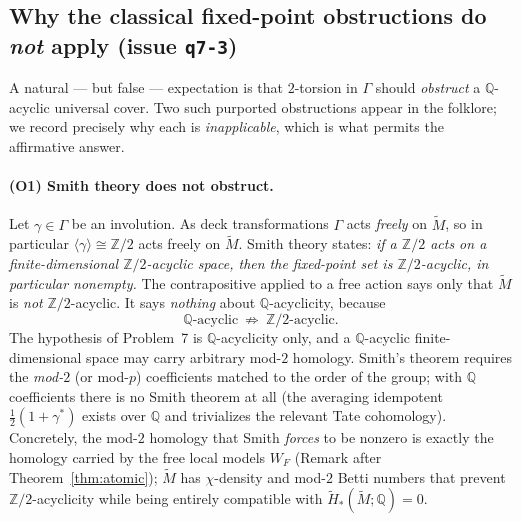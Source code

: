 \documentclass[12pt]{article}
\theoremstyle{definition}
\begin{document}
\subsection*{Why the classical fixed-point obstructions do \emph{not} apply
(issue \texttt{q7-3})}

A natural --- but false --- expectation is that $2$-torsion in $\Gamma$ should
\emph{obstruct} a $\mathbb{Q}$-acyclic universal cover. Two such purported
obstructions appear in the folklore; we record precisely why each is
\emph{inapplicable}, which is what permits the affirmative answer.

\paragraph{(O1) Smith theory does not obstruct.}
Let $\gamma\in\Gamma$ be an involution. As deck transformations $\Gamma$ acts
\emph{freely} on $\widetilde M$, so in particular $\langle\gamma\rangle\cong
\mathbb{Z}/2$ acts freely on $\widetilde M$. Smith theory states: \emph{if a
$\mathbb{Z}/2$ acts on a finite-dimensional $\mathbb{Z}/2$-acyclic space, then
the fixed-point set is $\mathbb{Z}/2$-acyclic, in particular nonempty.} The
contrapositive applied to a free action says only that $\widetilde M$ is
\emph{not} $\mathbb{Z}/2$-acyclic. It says \emph{nothing} about
$\mathbb{Q}$-acyclicity, because
\[
   \mathbb{Q}\text{-acyclic}\ \not\Longrightarrow\ \mathbb{Z}/2\text{-acyclic}.
\]
The hypothesis of Problem~7 is $\mathbb{Q}$-acyclicity only, and a
$\mathbb{Q}$-acyclic finite-dimensional space may carry arbitrary mod-$2$
homology. Smith's theorem requires the \emph{mod-$2$} (or mod-$p$) coefficients
matched to the order of the group; with $\mathbb{Q}$ coefficients there is no
Smith theorem at all (the averaging idempotent $\tfrac12(1+\gamma^*)$ exists over
$\mathbb{Q}$ and trivializes the relevant Tate cohomology). Concretely, the
mod-$2$ homology that Smith \emph{forces} to be nonzero is exactly the homology
carried by the free local models $W_F$ (Remark after
Theorem~\ref{thm:atomic}); $\widetilde M$ has $\chi$-density and mod-$2$ Betti
numbers that prevent $\mathbb{Z}/2$-acyclicity while being entirely compatible
with $\widetilde H_*(\widetilde M;\mathbb{Q})=0$.
\end{document}
